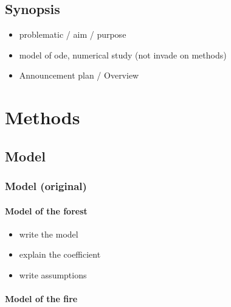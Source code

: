 \documentclass{article}
\begin{document}
\subsection*{Synopsis}

\begin{itemize}
    \item problematic / aim / purpose
    \item model of ode, numerical study (not invade on methods)
    \item Announcement plan / Overview
\end{itemize}


\newpage
\section{Methods}


\subsection{Model}

\subsubsection{Model (original)}

\paragraph{Model of the forest}

\begin{itemize}
    \item write the model 
    \item explain the coefficient
    \item write assumptions
\end{itemize}

\paragraph{Model of the fire}
\end{document}

